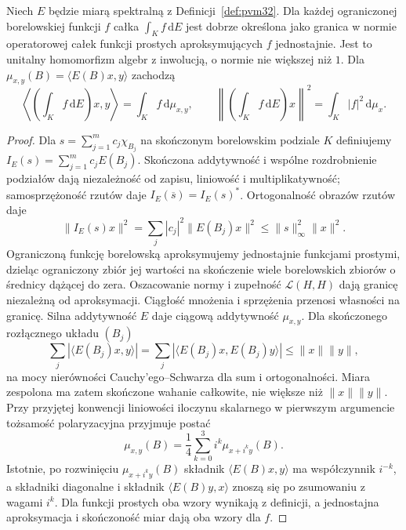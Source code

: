 \begin{lemat}
\label{lem:pvm-integral32}
Niech $E$ będzie miarą spektralną z Definicji~\ref{def:pvm32}.
Dla każdej ograniczonej borelowskiej funkcji $f$ całka
$\int_K f\,\mathrm dE$ jest dobrze określona jako granica
w normie operatorowej całek funkcji prostych aproksymujących
$f$ jednostajnie. Jest to unitalny homomorfizm algebr
z inwolucją, o normie nie większej niż $1$.
Dla $\mu_{x,y}(B)=\langle E(B)x,y\rangle$ zachodzą
\[
\left\langle\left(\int_K f\,\mathrm dE\right)x,y\right\rangle
=\int_K f\,\mathrm d\mu_{x,y},\qquad
\left\|\left(\int_K f\,\mathrm dE\right)x\right\|^2
=\int_K |f|^2\,\mathrm d\mu_x .
\]
\end{lemat}
\begin{proof}
Dla $s=\sum_{j=1}^m c_j\chi_{B_j}$ na skończonym
borelowskim podziale $K$ definiujemy
$I_E(s)=\sum_{j=1}^m c_j E(B_j)$. Skończona addytywność
i wspólne rozdrobnienie podziałów dają niezależność
od zapisu, liniowość i multiplikatywność; samosprzężoność
rzutów daje $I_E(\overline s)=I_E(s)^*$.
Ortogonalność obrazów rzutów daje
\[
\|I_E(s)x\|^2=\sum_j |c_j|^2\|E(B_j)x\|^2
\le\|s\|_\infty^2\|x\|^2 .
\]
Ograniczoną funkcję borelowską aproksymujemy jednostajnie
funkcjami prostymi, dzieląc ograniczony zbiór jej wartości
na skończenie wiele borelowskich zbiorów o średnicy
dążącej do zera. Oszacowanie normy i zupełność
$\mathcal L(H,H)$ dają granicę niezależną od aproksymacji.
Ciągłość mnożenia i sprzężenia przenosi własności na granicę.
Silna addytywność $E$ daje ciągową addytywność
$\mu_{x,y}$. Dla skończonego rozłącznego układu $(B_j)$
\[
\sum_j|\langle E(B_j)x,y\rangle|
=\sum_j|\langle E(B_j)x,E(B_j)y\rangle|
\le\|x\|\|y\|,
\]
na mocy nierówności Cauchy'ego--Schwarza dla sum i
ortogonalności. Miara zespolona ma zatem skończone
wahanie całkowite, nie większe niż $\|x\|\|y\|$. Przy przyjętej
konwencji liniowości iloczynu skalarnego w pierwszym argumencie
tożsamość polaryzacyjna przyjmuje postać
\[
 \mu_{x,y}(B)=\frac14\sum_{k=0}^3 i^k\mu_{x+i^k y}(B).
\]
Istotnie, po rozwinięciu $\mu_{x+i^k y}(B)$ składnik
$\langle E(B)x,y\rangle$ ma współczynnik $i^{-k}$,
a składniki diagonalne i składnik $\langle E(B)y,x\rangle$
znoszą się po zsumowaniu z wagami $i^k$.
Dla funkcji prostych oba wzory
wynikają z definicji, a jednostajna aproksymacja
i skończoność miar dają oba wzory dla $f$.
\end{proof}

